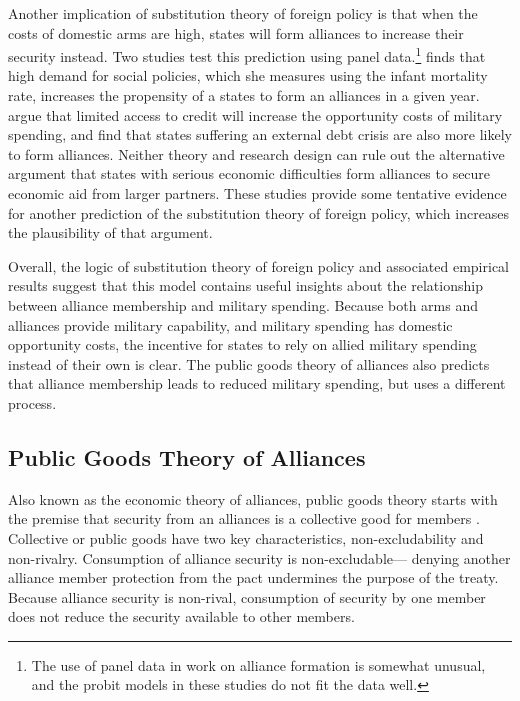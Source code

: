 \documentclass[12pt]{article}
\begin{document}
Another implication of substitution theory of foreign policy is that when the costs of domestic arms are high, states will form alliances to increase their security instead. 
Two studies test this prediction using panel data.\footnote{The use of panel data in work on alliance formation is somewhat unusual, and the probit models in these studies do not fit the data well.}
\citet{Kimball2010} finds that high demand for social policies, which she measures using the infant mortality rate, increases the propensity of a states to form an alliances in a given year.
\citet{AllenDigiuseppe2013} argue that limited access to credit will increase the opportunity costs of military spending, and find that states suffering an external debt crisis are also more likely to form alliances. 
Neither theory and research design can rule out the alternative argument that states with serious economic difficulties form alliances to secure economic aid from larger partners. 
These studies provide some tentative evidence for another prediction of the substitution theory of foreign policy, which increases the plausibility of that argument. 


Overall, the logic of substitution theory of foreign policy and associated empirical results suggest that this model contains useful insights about the relationship between alliance membership and military spending. 
Because both arms and alliances provide military capability, and military spending has domestic opportunity costs, the incentive for states to rely on allied military spending instead of their own is clear. 
The public goods theory of alliances also predicts that alliance membership leads to reduced military spending, but uses a different process. 



\subsection{Public Goods Theory of Alliances} 

Also known as the economic theory of alliances, public goods theory starts with the premise that security from an alliances is a collective good for members \citep{OlsonZeckhauser1966}.
Collective or public goods have two key characteristics, non-excludability and non-rivalry. 
Consumption of alliance security is non-excludable--- denying another alliance member protection from the pact undermines the purpose of the treaty.  
Because alliance security is non-rival, consumption of security by one member does not reduce the security available to other members. 
\end{document}
